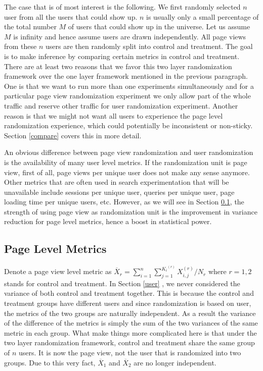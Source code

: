 \documentclass[11pt]{asaproc}
\newcommand{\xbar}{\overline{X}}
\begin{document}
The case that is of most interest is the following. We first randomly selected $n$ user from all the users that could show up. $n$ is usually only a small percentage of the total number $M$ of users that could show up in the universe. Let us assume $M$ is infinity and hence assume users are drawn independently. All page views from these $n$ users are then randomly split into control and treatment. The goal is to make inference by comparing certain metrics in control and treatment. There are at least two reasons that we favor this two layer randomization framework over the one layer framework mentioned in the previous paragraph. One is that we want to run more than one experiments simultaneously and for a particular page view randomization experiment we only allow part of the whole traffic and reserve other traffic for user randomization experiment. Another reason is that we might not want all users to experience the page level randomization experience, which could potentially be inconsistent or non-sticky. Section \ref{compare} covers this in more detail. 

An obvious difference between page view randomization and user randomization is the availability of many user level metrics. If the randomization unit is page view, first of all, page views per unique user does not make any sense anymore. Other metrics that are often used in search experimentation that will be unavailable include sessions per unique user, queries per unique user, page loading time per unique users, etc. However, as we will see in Section \ref{page-page}, the strength of using page view as randomization unit is the improvement in variance reduction for page level metrics, hence a boost in statistical power.

\subsection{Page Level Metrics}\label{page-page}
Denote a page view level metric as $\xbar_r = \sum_{i=1}^n \sum_{j=1}^{{K_i}^{(r)}}X_{i,j}^{(r)}/N_r$ where $r=1,2$ stands for control and treatment. In Section \ref{user} , we never considered the variance of both control and treatment together. This is because the control and treatment groups have different users and since randomization is based on user, the metrics of the two groups are naturally independent. As a result the variance of the difference of the metrics is simply the sum of the two variances of the same metric in each group.  What make things more complicated here is that under the two layer randomization framework, control and treatment share the same group of $n$ users. It is now the page view, not the user that is randomized into two groups. Due to this very fact, $\xbar_1$ and $\xbar_2$ are no longer independent. 
\end{document}
